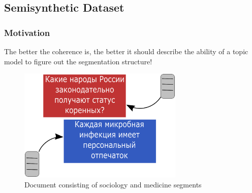 \documentclass[russian]{beamer}
\begin{document}
\subsection{Semisynthetic Dataset}
\begin{frame}
  \frametitle{Motivation}
  \begin{block}{}
    The better the coherence is, the better it should describe the ability of a topic model to figure out the segmentation structure!
  \end{block}   
  \begin{figure}[h]
    \centering
    \includegraphics[width=0.7\textwidth, height=0.5\textheight]{pn_gen_diagram.eps}
    \caption*{Document consisting of sociology and medicine segments}
  \end{figure}    
\end{frame}
\end{document}

